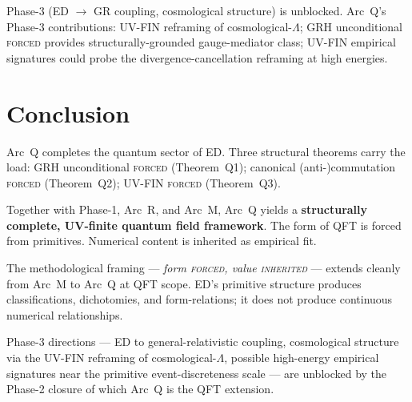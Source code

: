 \documentclass[11pt,a4paper]{article}
\begin{document}
Phase-3 (ED $\to$ GR coupling, cosmological structure) is unblocked. Arc~Q's Phase-3 contributions: UV-FIN reframing of cosmological-$\Lambda$; GRH unconditional \textsc{forced} provides structurally-grounded gauge-mediator class; UV-FIN empirical signatures could probe the divergence-cancellation reframing at high energies.

\section{Conclusion}

Arc~Q completes the quantum sector of ED. Three structural theorems carry the load: GRH unconditional \textsc{forced} (Theorem~Q1); canonical (anti-)commutation \textsc{forced} (Theorem~Q2); UV-FIN \textsc{forced} (Theorem~Q3).

Together with Phase-1, Arc~R, and Arc~M, Arc~Q yields a \textbf{structurally complete, UV-finite quantum field framework}. The form of QFT is forced from primitives. Numerical content is inherited as empirical fit.

The methodological framing --- \emph{form \textsc{forced}, value \textsc{inherited}} --- extends cleanly from Arc~M to Arc~Q at QFT scope. ED's primitive structure produces classifications, dichotomies, and form-relations; it does not produce continuous numerical relationships.

Phase-3 directions --- ED to general-relativistic coupling, cosmological structure via the UV-FIN reframing of cosmological-$\Lambda$, possible high-energy empirical signatures near the primitive event-discreteness scale --- are unblocked by the Phase-2 closure of which Arc~Q is the QFT extension.
\end{document}
